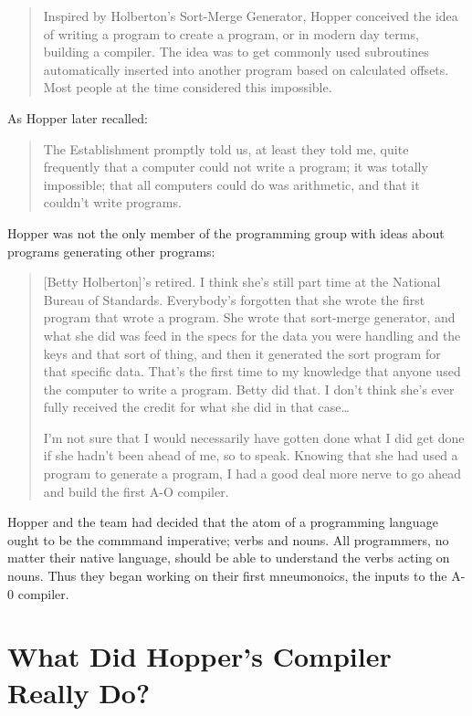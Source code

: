 \begin{quotation}
Inspired by Holberton's Sort-Merge Generator, Hopper conceived the idea of writing a 
program to create a program, or in modern day terms, building a compiler. 
The idea was to get commonly used subroutines automatically inserted into another program based on calculated offsets. 
Most people at the time considered this impossible.
\cite{women_in_computing_history_2002}
\end{quotation}

As Hopper later recalled:
\begin{quotation}
The Establishment promptly told us, at least they told me, quite frequently that a
computer could not write a program; it was totally impossible; that all computers
could do was arithmetic, and that it couldn't write programs.
\cite{hopl_keynote}
\end{quotation}

Hopper was not the only member of the programming group with ideas about
programs generating other programs:

\begin{quotation}
[Betty Holberton]'s retired. I think she's still part time at the National Bureau of Standards.
Everybody's forgotten that she wrote the first program that wrote a program. She wrote that
sort-merge generator, and what she did was feed in the specs for the data you were handling
and the keys and that sort of thing, and then it generated the sort program for that specific data.
That's the first time to my knowledge that anyone used the computer to write a program. Betty
did that. I don't think she's ever fully received the credit for what she did in that case\dots

I'm not sure that I would necessarily have gotten done what I did get done if 
she hadn't been ahead of me, so to speak.  Knowing that she had used a program 
to generate a program, I had a good deal more nerve to go ahead and build the 
first A-O compiler.
\end{quotation}

Hopper and the team had decided that the atom of a programming language ought to be the
commmand imperative; verbs and nouns.
All programmers, no matter their native language, should be able to understand the verbs acting on nouns.
Thus they began working on their first mneumonoics, the inputs to the A-0 compiler.

\section{What Did Hopper's Compiler Really Do?}

